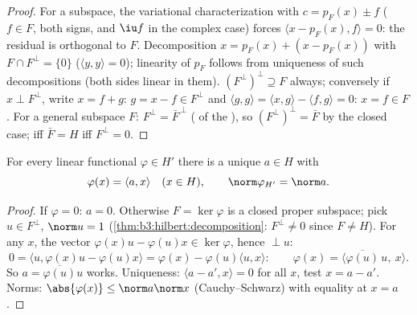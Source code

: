 \begin{proof}
For a subspace, the variational characterization with $c =
p_F(x) \pm f$ ($f \in F$, both signs, and $\iu f$ in the
complex case) forces $\langle x - p_F(x), f\rangle = 0$: the
residual is orthogonal to $F$. Decomposition $x = p_F(x) + (x
- p_F(x))$ with $F \cap F^\perp = \{0\}$ ($\langle y, y
\rangle = 0$); linearity of $p_F$ follows from uniqueness of
such decompositions (both sides linear in them). $(F^\perp)
^\perp \supseteq F$ always; conversely if $x \perp F^\perp$,
write $x = f + g$: $g = x - f \in F^\perp$ and $\langle g,
g\rangle = \langle x, g\rangle - \langle f, g\rangle = 0$: $x
= f \in F$. For a general subspace $F$: $F^\perp = \bar
F^{\,\perp}$ ( of the ), so
$(F^\perp)^\perp = \bar F$ by the closed case;  iff
$\bar F = H$ iff $F^\perp = 0$.
\end{proof}

\begin{theorem}\label{thm:b3:hilbert:riesz}
For every  linear functional $\varphi \in H'$ there
is a unique $a \in H$ with
\[
\varphi(x) = \langle a, x\rangle \quad (x \in H),
\qquad \norm\varphi_{H'} = \norm a .
\]
\end{theorem}

\begin{proof}
If $\varphi = 0$: $a = 0$. Otherwise $F = \ker\varphi$ is a
closed proper subspace; pick $u \in F^\perp$, $\norm u = 1$
(\cref{thm:b3:hilbert:decomposition}: $F^\perp \neq 0$ since
$F \neq H$). For any $x$, the vector $\varphi(x)u -
\varphi(u)x \in \ker\varphi$, hence $\perp u$:
\[
0 = \langle u, \varphi(x)u - \varphi(u)x\rangle
= \varphi(x) - \varphi(u)\langle u, x\rangle :
\qquad \varphi(x) = \langle
\overline{\varphi(u)}\,u,\ x\rangle .
\]
So $a = \overline{\varphi(u)}u$ works. Uniqueness: $\langle a
- a', x\rangle = 0$ for all $x$, test $x = a - a'$. Norms:
$\abs{\varphi(x)} \leq \norm a\norm x$ (Cauchy--Schwarz) with
equality at $x = a$.
\end{proof}

